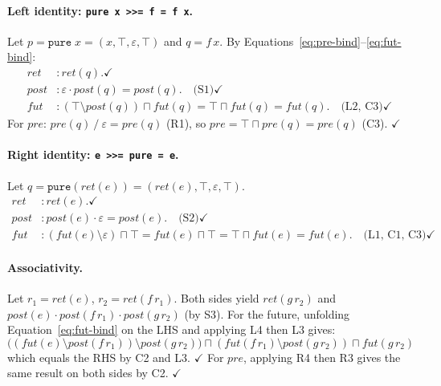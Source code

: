 \documentclass[acmsmall,screen]{acmart}
\newcommand{\pre}{\mathit{pre}}
\newcommand{\post}{\mathit{post}}
\newcommand{\fut}{\mathit{fut}}
\newcommand{\ret}{\mathit{ret}}
\newcommand{\lquot}{\mathbin{\setminus}}   %
\newcommand{\rquot}{\mathbin{/}}           %
\begin{document}
\paragraph{Left identity: \lstinline{pure x >>= f = f x}.}

Let $p = \mathtt{pure}\;x = (x, \top, \varepsilon, \top)$ and $q = f\,x$.
By Equations~\eqref{eq:pre-bind}--\eqref{eq:fut-bind}:
\begin{align*}
  \ret  &: \ret(q). \checkmark \\
  \post &: \varepsilon \cdot \post(q) = \post(q). \quad\text{(S1)} \checkmark \\
  \fut  &: (\top \lquot \post(q)) \sqcap \fut(q)
         = \top \sqcap \fut(q) = \fut(q). \quad\text{(L2, C3)} \checkmark
\end{align*}
For $\pre$: $\pre(q) \rquot \varepsilon = \pre(q)$ (R1), so $\pre = \top \sqcap \pre(q)
= \pre(q)$ (C3). $\checkmark$

\paragraph{Right identity: \lstinline{e >>= pure = e}.}

Let $q = \mathtt{pure}(\ret(e)) = (\ret(e), \top, \varepsilon, \top)$.
\begin{align*}
  \ret  &: \ret(e). \checkmark \\
  \post &: \post(e) \cdot \varepsilon = \post(e). \quad\text{(S2)} \checkmark \\
  \fut  &: (\fut(e) \lquot \varepsilon) \sqcap \top
         = \fut(e) \sqcap \top = \top \sqcap \fut(e) = \fut(e). \quad\text{(L1, C1, C3)} \checkmark
\end{align*}

\paragraph{Associativity.}

Let $r_1 = \ret(e)$, $r_2 = \ret(f\,r_1)$.
Both sides yield $\ret(g\,r_2)$ and
$\post(e) \cdot \post(f\,r_1) \cdot \post(g\,r_2)$ (by S3).
For the future, unfolding Equation~\eqref{eq:fut-bind} on the LHS and
applying L4 then L3 gives:
\[
  \bigl((\fut(e) \lquot \post(f\,r_1)) \lquot \post(g\,r_2)\bigr) \sqcap
  (\fut(f\,r_1) \lquot \post(g\,r_2)) \sqcap \fut(g\,r_2)
\]
which equals the RHS by C2 and L3. $\checkmark$
For $\pre$, applying R4 then R3 gives the same result on both sides by C2. $\checkmark$

\end{document}
